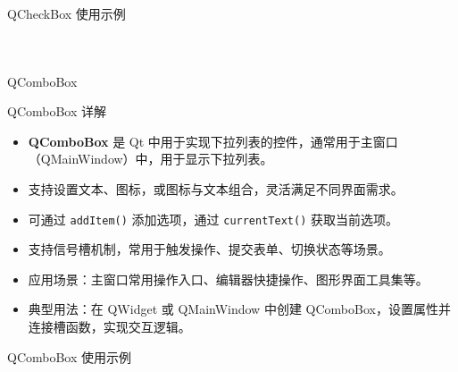 \documentclass[UTF8,aspectratio=169]{beamer}
\begin{document}
\begin{frame}[fragile]{QCheckBox 使用示例}
    \begin{columns}
        \begin{column}{0.48\textwidth}
            \inputminted[firstline=1,lastline=19]{cpp}{code/qt_checkbox_example.cpp}
        \end{column}
        \begin{column}{0.48\textwidth}
            \inputminted[firstline=20,lastline=38]{cpp}{code/qt_checkbox_example.cpp}
        \end{column}
    \end{columns}
\end{frame}

\begin{frame}{QComboBox}
    \begin{ytublock}{QComboBox 详解}
        \begin{itemize}
            \item \textbf{QComboBox} 是 Qt 中用于实现下拉列表的控件，通常用于主窗口（QMainWindow）中，用于显示下拉列表。
            \item 支持设置文本、图标，或图标与文本组合，灵活满足不同界面需求。
            \item 可通过 \texttt{addItem()} 添加选项，通过 \texttt{currentText()} 获取当前选项。
            \item 支持信号槽机制，常用于触发操作、提交表单、切换状态等场景。
            \item 应用场景：主窗口常用操作入口、编辑器快捷操作、图形界面工具集等。
            \item 典型用法：在 QWidget 或 QMainWindow 中创建 QComboBox，设置属性并连接槽函数，实现交互逻辑。
        \end{itemize}
    \end{ytublock}
\end{frame}

\begin{frame}[fragile]{QComboBox 使用示例}
    \begin{columns}
        \begin{column}{0.48\textwidth}
            \inputminted[firstline=1,lastline=15]{cpp}{code/qt_combobox_example.cpp}
        \end{column}
        \begin{column}{0.48\textwidth}
            \inputminted[firstline=16,lastline=30]{cpp}{code/qt_combobox_example.cpp}
        \end{column}
    \end{columns}
\end{frame}
\end{document}
